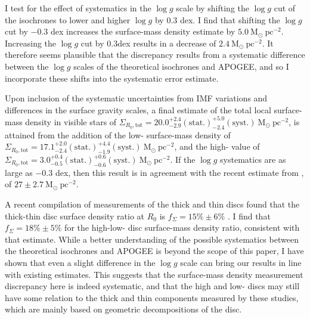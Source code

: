 I test for the effect of systematics in the $\log{g}$ scale by shifting the $\log{g}$ cut of the isochrones to lower and higher $\log{g}$ by $0.3$ dex. I find that shifting the $\log{g}$ cut by $-0.3$ dex increases the surface-mass density estimate by $5.0\ \mathrm{M_{\odot}\ pc^{-2}}$. Increasing the $\log{g}$ cut by $0.3$dex results in a decrease of $ 2.4\ \mathrm{M_{\odot}\ pc^{-2}}$. It therefore seems plausible that the discrepancy results from a systematic difference between the $\log{g}$ scales of the theoretical isochrones and APOGEE, and so I incorporate these shifts into the systematic error estimate. 

Upon inclusion of the systematic uncertainties from IMF variations and differences in the surface gravity scales, a final estimate of the total local surface-mass density in visible stars of $\Sigma_{R_0, \text{tot}} = 20.0_{-2.9}^{+2.4}\mathrm{(stat.)}_{-2.4}^{+5.0}\mathrm{(syst.)}\ \mathrm{M_{\odot} \ pc^{-2}}$, is attained from the addition of the low-\afe{} surface-mass density of $\Sigma_{R_0, \text{tot}} = 17.1_{-2.4}^{+2.0}\mathrm{(stat.)}_{-1.9}^{+4.4}\mathrm{(syst.)}\ \mathrm{M_{\odot} \ pc^{-2}}$, and the high-\afe{} value of $\Sigma_{R_0, \text{tot}} = 3.0_{-0.5}^{+0.4}\mathrm{(stat.)}_{-0.6}^{+0.6}\mathrm{(syst.)}\ \mathrm{M_{\odot} \ pc^{-2}}$.  If the $\log{g}$ systematics are as large as $-0.3$ dex, then this result is in agreement with the recent estimate from \citet{2015ApJ...814...13M}, of $27\pm 2.7\ \mathrm{M_{\odot} \ pc^{-2}}$.

A recent compilation of measurements of the thick and thin discs found that the thick-thin disc surface density ratio at $R_0$ is $f_{\Sigma} = 15\% \pm 6\%$ \citep{2016ARA&A..54..529B}. I find that $f_{\Sigma} = 18\% \pm 5\%$ for the high-low-\afe{} disc surface-mass density ratio, consistent with that estimate. While a better understanding of the possible systematics between the theoretical isochrones and APOGEE is beyond the scope of this paper, I have shown that even a slight difference in the $\log{g}$ scale can bring our results in line with existing estimates. This suggests that the surface-mass density measurement discrepancy here is indeed systematic, and that the high and low-\afe{} discs may still have some relation to the thick and thin components measured by these studies, which are mainly based on geometric decompositions of the disc. 

